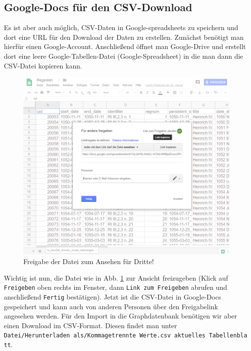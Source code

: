 \documentclass[ngerman,]{scrreprt}
\begin{document}
\hypertarget{google-docs-fuxfcr-den-csv-download}{%
\subsection{Google-Docs für den CSV-Download}\label{google-docs-fuxfcr-den-csv-download}}

Es ist aber auch möglich, CSV-Daten in Google-spreadsheets zu speichern und dort eine URL für den Download der Daten zu erstellen. Zunächst benötigt man hierfür einen Google-Account. Anschließend öffnet man Google-Drive und erstellt dort eine leere Google-Tabellen-Datei (Google-Spreadsheet) in die man dann die CSV-Datei kopieren kann.

\begin{figure}
\centering
\includegraphics{Bilder/RI2Graph/google-docs-freigeben.png}
\caption{Freigabe der Datei zum Ansehen für Dritte!}
\label{freigeben}
\end{figure}

Wichtig ist nun, die Datei wie in Abb. \ref{freigeben} zur Ansicht freizugeben (Klick auf \texttt{Freigeben} oben rechts im Fenster, dann \texttt{Link\ zum\ Freigeben} abrufen und anschließend \texttt{Fertig} bestätigen). Jetzt ist die CSV-Datei in Google-Docs gespeichert und kann auch von anderen Personen über den Freigabelink angesehen werden. Für den Import in die Graphdatenbank benötigen wir aber einen Download im CSV-Format. Diesen findet man unter \texttt{Datei/Herunterladen\ als/Kommagetrennte\ Werte.csv\ aktuelles\ Tabellenblatt}.
\end{document}
